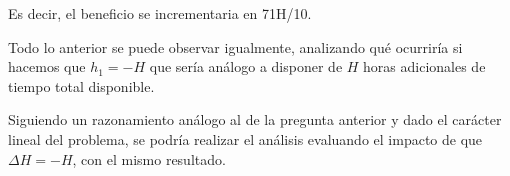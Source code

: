 \begin{enumerate}
    Es decir, el beneficio se incrementaria en 71H/10.

    Todo lo anterior se puede observar igualmente, analizando qué ocurriría si hacemos que $h_1 = -H$ que sería análogo a disponer de $H$ horas adicionales de tiempo total disponible.

    Siguiendo un razonamiento análogo al de la pregunta anterior y dado el carácter lineal del problema, se podría realizar el análisis evaluando el impacto de que $\Delta H = -H$, con el mismo resultado.
    

    

    
\end{enumerate}


